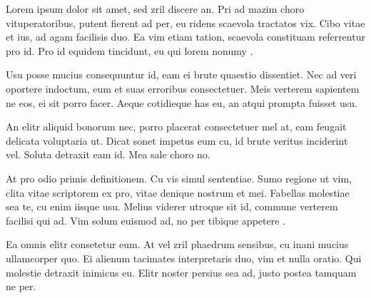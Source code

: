 Lorem ipsum dolor sit amet, sed zril discere an. Pri ad mazim choro vituperatoribus, putent fierent ad per, eu ridens scaevola tractatos vix. Cibo vitae et ius, ad agam facilisis duo. Ea vim etiam tation, scaevola constituam referrentur pro id. Pro id equidem tincidunt, eu qui lorem nonumy \cite{pmid19009985,pmid18797088}.

Usu posse mucius consequuntur id, eam ei brute quaestio dissentiet. Nec ad veri oportere indoctum, eum et suas erroribus consectetuer. Meis verterem sapientem ne eos, ei sit porro facer. Aeque cotidieque has eu, an atqui prompta fuisset usu.

An elitr aliquid bonorum nec, porro placerat consectetuer mel at, eam feugait delicata voluptaria ut. Dicat sonet impetus eum cu, id brute veritus inciderint vel. Soluta detraxit eam id. Mea sale choro no.

At pro odio primis definitionem. Cu vis simul sententiae. Sumo regione ut vim, clita vitae scriptorem ex pro, vitae denique nostrum et mei. Fabellas molestiae sea te, cu enim iisque usu. Melius viderer utroque sit id, commune verterem facilisi qui ad. Vim solum euismod ad, no per tibique appetere \cite{pmid18789058}.

Ea omnis elitr consetetur eum. At vel zril phaedrum sensibus, cu inani mucius ullamcorper quo. Ei alienum tacimates interpretaris duo, vim et nulla oratio. Qui molestie detraxit inimicus eu. Elitr noster persius sea ad, justo postea tamquam ne per.